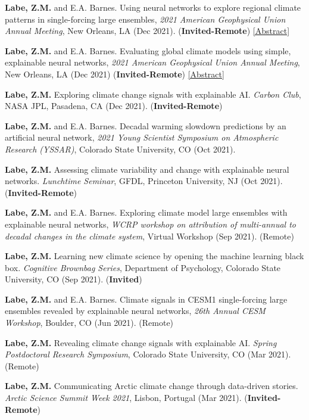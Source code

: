 \documentclass[margin,line,palatino,courier,10pt]{res}
\begin{document}
\begin{resume}
\begin{etaremune}[leftmargin=0in,topsep=0in,parsep=0in]
\item \textbf{Labe, Z.M.} and E.A. Barnes. Using neural networks to explore regional climate patterns in single-forcing large ensembles, \textit{2021 American Geophysical Union Annual Meeting}, New Orleans, LA (Dec 2021). (\textbf{Invited-Remote}) \href{https://agu.confex.com/agu/fm21/meetingapp.cgi/Paper/798039}{[Abstract]}
\item \textbf{Labe, Z.M.} and E.A. Barnes. Evaluating global climate models using simple, explainable neural networks, \textit{2021 American Geophysical Union Annual Meeting}, New Orleans, LA (Dec 2021) (\textbf{Invited-Remote}) \href{https://agu.confex.com/agu/fm21/meetingapp.cgi/Paper/797879}{[Abstract]}
\item \textbf{Labe, Z.M.} Exploring climate change signals with explainable AI. \textit{Carbon Club}, NASA JPL, Pasadena, CA (Dec 2021). (\textbf{Invited-Remote})
\item \textbf{Labe, Z.M.} and E.A. Barnes. Decadal warming slowdown predictions by an artificial neural network, \textit{2021 Young Scientist Symposium on Atmospheric Research (YSSAR)}, Colorado State University, CO (Oct 2021).
\item \textbf{Labe, Z.M.} Assessing climate variability and change with explainable neural networks. \textit{Lunchtime Seminar}, GFDL, Princeton University, NJ (Oct 2021). (\textbf{Invited-Remote})
\item \textbf{Labe, Z.M.} and E.A. Barnes. Exploring climate model large ensembles with explainable neural networks, \textit{WCRP workshop on attribution of multi-annual to decadal changes in the climate system}, Virtual Workshop (Sep 2021). (Remote)
\item \textbf{Labe, Z.M.} Learning new climate science by opening the machine learning black box. \textit{Cognitive Brownbag Series}, Department of Psychology, Colorado State University, CO (Sep 2021). (\textbf{Invited})
\item \textbf{Labe, Z.M.} and E.A. Barnes. Climate signals in CESM1 single-forcing large ensembles revealed by explainable neural networks, \textit{26th Annual CESM Workshop}, Boulder, CO (Jun 2021). (Remote)
\item \textbf{Labe, Z.M.} Revealing climate change signals with explainable AI. \textit{Spring Postdoctoral Research Symposium}, Colorado State University, CO (Mar 2021). (Remote)
\item \textbf{Labe, Z.M.} Communicating Arctic climate change through data-driven stories. \textit{Arctic Science Summit Week 2021}, Lisbon, Portugal (Mar 2021). (\textbf{Invited-Remote})

\end{etaremune}
\end{resume}
\end{document}
